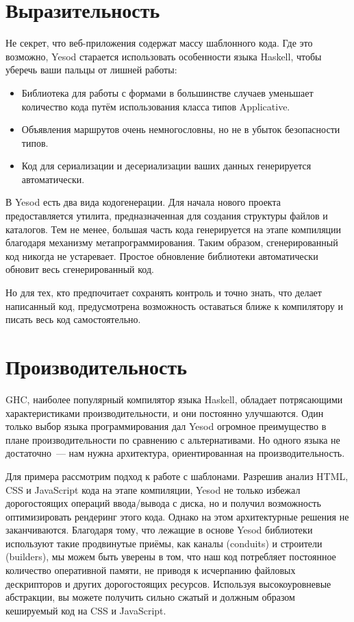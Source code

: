 \section{Выразительность}

Не секрет, что веб-приложения содержат массу шаблонного кода. Где это возможно,
Yesod старается использовать особенности языка Haskell, чтобы уберечь ваши
пальцы от лишней работы:

\begin{itemize}
    \item Библиотека для работы с формами в большинстве случаев уменьшает
        количество кода путём использования класса типов Applicative.
    \item Объявления маршрутов очень немногословны, но не в убыток безопасности
        типов.
    \item Код для сериализации и десериализации ваших данных генерируется
        автоматически.
\end{itemize}

В Yesod есть два вида кодогенерации. Для начала нового проекта предоставляется
утилита, предназначенная для создания структуры файлов и каталогов. Тем не
менее, большая часть кода генерируется на этапе компиляции благодаря механизму
метапрограммирования. Таким образом, сгенерированный код никогда не устаревает.
Простое обновление библиотеки автоматически обновит весь сгенерированный код.

Но для тех, кто предпочитает сохранять контроль и точно знать, что делает
написанный код, предусмотрена возможность оставаться ближе к компилятору и
писать весь код самостоятельно.

\section{Производительность}

GHC, наиболее популярный компилятор языка Haskell, обладает потрясающими
характеристиками производительности, и они постоянно улучшаются. Один только
выбор языка программирования дал Yesod огромное преимущество в плане
производительности по сравнению с альтернативами. Но одного языка не
достаточно~--- нам нужна архитектура, ориентированная на производительность.

Для примера рассмотрим подход к работе с шаблонами. Разрешив анализ HTML, CSS и
JavaScript кода на этапе компиляции, Yesod не только избежал дорогостоящих
операций ввода/вывода с диска, но и получил возможность оптимизировать
рендеринг этого кода. Однако на этом архитектурные решения не заканчиваются.
Благодаря тому, что лежащие в основе Yesod библиотеки используют такие
продвинутые приёмы, как каналы (conduits) и строители (builders), мы можем быть
уверены в том, что наш код потребляет постоянное количество оперативной памяти,
не приводя к исчерпанию файловых дескрипторов и других дорогостоящих ресурсов.
Используя высокоуровневые абстракции, вы можете получить сильно сжатый и
должным образом кешируемый код на CSS и JavaScript.

